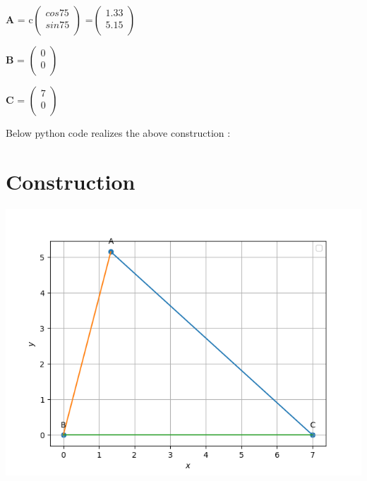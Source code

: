 \documentclass[10pt,a4paper]{report}
\begin{document}
\begin{multicols}{2}
     \raggedright \textbf{A} = c$\begin{pmatrix}
                 cos 75 \\ 
                 sin 75 \\
              \end{pmatrix}$%
              =$\begin{pmatrix}
                 1.33 \\
                 5.15 \\
                 \end{pmatrix}$%
                 \vspace{5mm}
              \\ \raggedright  \textbf{B} = $\begin{pmatrix}
                 0\\
                 0\\
              \end{pmatrix}$%
              \vspace{5mm}
             \\ \raggedright  \textbf{C} = $\begin{pmatrix}
                  7\\
                  0\\
              \end{pmatrix}$%
 \begin{center}
Below python code realizes the above construction : 
\end{center}
 \section{Construction}
 	\begin{center}
  \includegraphics[scale=0.5]{Figure_1.png}
  	\end{center}
\vspace{3cm}
\end{multicols}
\end{document}
